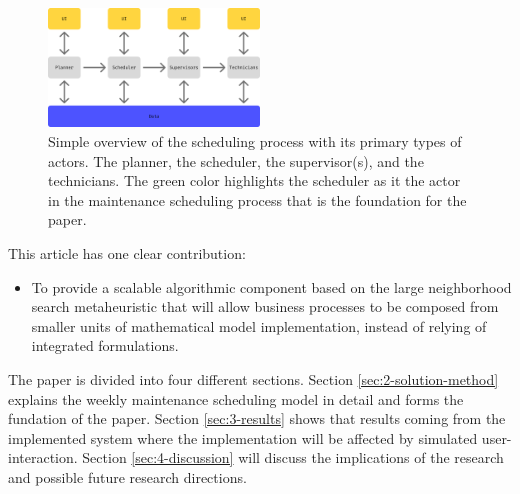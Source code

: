 \begin{figure}[H]
\centering
\includegraphics[width=0.5\textwidth]{figures/Scheduling Process Integrated.png}
\caption{Simple overview of the scheduling process with its primary types of actors. The planner, the scheduler, the supervisor(s), and the technicians. 
The green color highlights the scheduler as it the actor in the maintenance scheduling process that is the foundation for the paper.}
\label{fig:simple-maintenance-process}
\end{figure}

This article has one clear contribution:
\begin{itemize}
	\item To provide a scalable algorithmic component based on the large neighborhood search metaheuristic that will allow business processes to be composed from smaller units of mathematical model implementation, instead of relying of integrated formulations.
\end{itemize}

The paper is divided into four different sections. Section \ref{sec:2-solution-method} explains the weekly maintenance scheduling model in detail and forms the fundation of the paper. Section \ref{sec:3-results} shows that results coming from the implemented system where the implementation will be affected by simulated user-interaction. Section \ref{sec:4-discussion} will discuss the implications of the research and possible future research directions.


